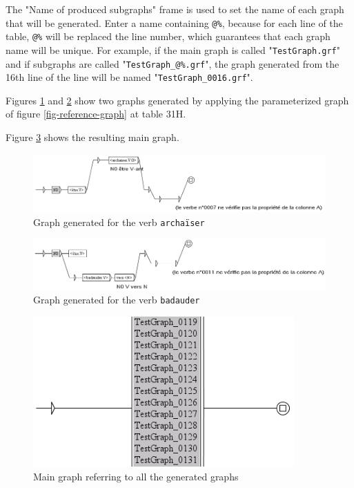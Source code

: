 \bigskip
\noindent The "Name of produced subgraphs" frame is used to set the name of each
graph that will be generated. Enter a name containing \verb+@%+, because for each line of
the table, \verb+@%+ will be replaced the line number, which guarantees that each
graph name will be unique. For example, if the main graph is called
"\verb+TestGraph.grf+" and if subgraphs are called "\verb+TestGraph_@%.grf+", the
graph generated from the 16th line of the line will be named
"\verb+TestGraph_0016.grf+".

\bigskip
\noindent Figures \ref{fig-archaiser} and \ref{fig-badauder} show
two graphs generated by applying the parameterized graph of figure
\ref{fig-reference-graph} at table 31H.

\bigskip
\noindent Figure \ref{fig-main-graph} shows the resulting main graph.

\begin{figure}[!h]
\begin{center}
\includegraphics[width=15cm]{resources/img/fig8-8.png}
\caption{Graph generated for the verb
\texttt{archa\"iser}\label{fig-archaiser}}
\end{center}
\end{figure}

\begin{figure}[!h]
\begin{center}
\includegraphics[width=15cm]{resources/img/fig8-9.png}
\caption{Graph generated for the verb \texttt{badauder}\label{fig-badauder}}
\end{center}
\end{figure}

\begin{figure}[!h]
\begin{center}
\includegraphics[width=10cm]{resources/img/fig8-10.png}
\caption{Main graph referring to all the generated
graphs\label{fig-main-graph}}
\end{center}
\end{figure}


